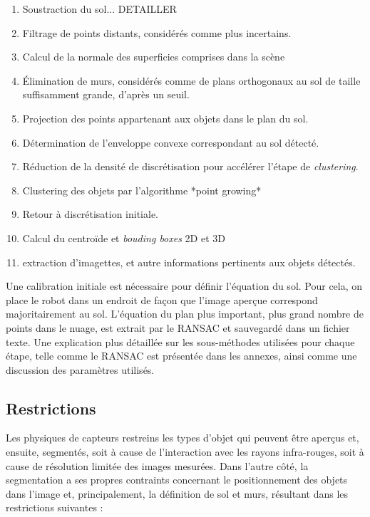 \begin{enumerate}
\item Soustraction du sol... {\color{blue} DETAILLER}

\item Filtrage de points distants, considérés comme plus incertains.

\item Calcul de la normale des superficies comprises dans la scène

\item Élimination de murs, considérés comme de plans orthogonaux au
  sol de taille suffisamment grande, d'après un seuil.

\item Projection des points appartenant aux objets dans le plan du
  sol.

\item Détermination de l’enveloppe convexe correspondant au sol détecté.

\item Réduction de la densité de discrétisation pour accélérer l'étape
  de \textit{clustering}.

\item Clustering des objets par l'algorithme *point growing*

\item Retour à discrétisation initiale.

\item Calcul du centroïde et \textit{bouding boxes} 2D et 3D

\item extraction d’imagettes, et autre informations pertinents aux
  objets détectés.
\end{enumerate}

Une calibration initiale est nécessaire pour définir l'équation du
sol. Pour cela, on place le robot dans un endroit de façon que l'image
aperçue correspond majoritairement au sol. L’équation du plan plus
important, plus grand nombre de points dans le nuage, est extrait par
le RANSAC et sauvegardé dans un fichier texte. Une explication plus
détaillée sur les sous-méthodes utilisées pour chaque étape, telle
comme le RANSAC est présentée dans les annexes, ainsi comme une
discussion des paramètres utilisés.

\subsection{Restrictions} Les physiques de capteurs restreins les
types d'objet qui peuvent être aperçus et, ensuite, segmentés, soit à
cause de l'interaction avec les rayons infra-rouges, soit à cause de
résolution limitée des images mesurées. Dans l'autre côté, la
segmentation a ses propres contraints concernant le positionnement des
objets dans l'image et, principalement, la définition de sol et murs,
résultant dans les restrictions suivantes :


